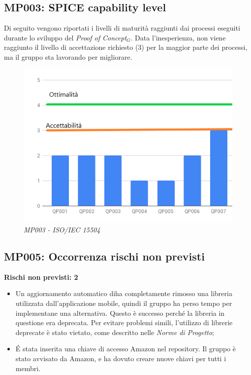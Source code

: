 \subsection{MP003: SPICE capability level}
Di seguito vengono riportati i livelli di maturità raggiunti dai processi eseguiti durante lo sviluppo del \textit{Proof of Concept$_{G}$}. Data l'inesperienza, non viene raggiunto il livello di accettazione richiesto (3) per la maggior parte dei processi, ma il gruppo sta lavorando per migliorare.
\begin{figure} [H]
    \centering
	\includegraphics[scale=0.5]{./images/15504.png}
    \caption{\textit{MP003 - ISO/IEC 15504 }}\label{}
\end{figure}

\subsection{MP005:  Occorrenza rischi non previsti}
\textbf{Rischi non previsti: 2}
\begin{itemize}
	\item Un aggiornamento automatico diha completamente rimosso una libreria utilizzata dall'applicazione mobile, quindi il gruppo ha perso tempo per implementane una alternativa. Questo è successo perché la libreria in questione era deprecata. Per evitare problemi simili, l'utilizzo di librerie deprecate è stato vietato, come descritto nelle \textit{Norme di Progetto};
	\item É stata inserita una chiave di accesso Amazon nel repository. Il gruppo è stato avvisato da Amazon, e ha dovuto creare nuove chiavi per tutti i membri.
\end{itemize}

